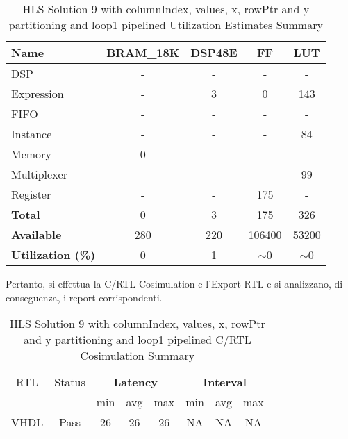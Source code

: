 \begin{table}[H]
	\centering
	\begin{tabular}{|l|c|c|c|c|}
		\hline
		\textbf{Name}    & \textbf{BRAM\_18K} & \textbf{DSP48E} & \textbf{FF} & \textbf{LUT} \\ \hline
		DSP              & -                   & -               & -           & -            \\ 
		Expression       & -                   & 3              & 0           & 143          \\ 
		FIFO             & -                   & -               & -           & -            \\ 
		Instance         & -                   & -               & -           & 84            \\ 
		Memory           & 0                   & -               & -          & -            \\ 
		Multiplexer      & -                   & -               & -           & 99          \\ 
		Register         & -                   & -               & 175         & -            \\ \hline
		\textbf{Total}   & 0                   & 3               & 175         & 326          \\ \hline
		\textbf{Available} & 280               & 220             & 106400      & 53200        \\ \hline
		\textbf{Utilization (\%)} & 0            & 1               & $\sim$0     & $\sim$0      \\ \hline
	\end{tabular}
	\caption{HLS Solution 9 with columnIndex, values, x, rowPtr and y partitioning and loop1 pipelined Utilization Estimates Summary}
	\label{tab:hls-solution-9-loop1-pipeline-utilization-estimates-summary}
\end{table}

Pertanto, si effettua la C/RTL Cosimulation e l'Export RTL e si analizzano, di conseguenza, i report corrispondenti.

\begin{table}[H]
	\centering
	\begin{tabular}{|c|c|c|c|c|c|c|c|}
		\hline
		\multicolumn{1}{|c|}{RTL} & \multicolumn{1}{|c|}{Status} & \multicolumn{3}{c|}{\textbf{Latency}} & \multicolumn{3}{c|}{\textbf{Interval}} \\
		&  & min & avg & max & min & avg & max \\
		\hline
		VHDL & Pass & 26 & 26 & 26 & NA & NA & NA \\
		\hline
	\end{tabular}
	\caption{HLS Solution 9 with columnIndex, values, x, rowPtr and y partitioning and loop1 pipelined C/RTL Cosimulation Summary }
	\label{tab:hls-solution-9-loop1-pipeline-cosimulation-summary}
\end{table}


